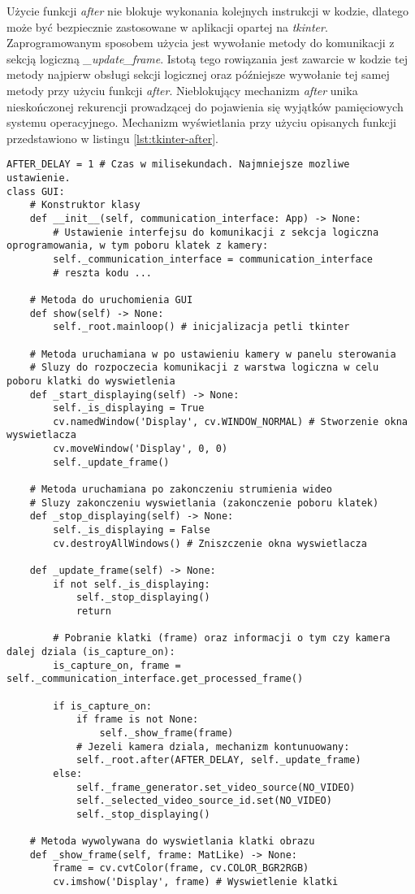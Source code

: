 Użycie funkcji \emph{after} nie blokuje wykonania kolejnych instrukcji w kodzie, dlatego może być bezpiecznie zastosowane w aplikacji opartej na \emph{tkinter}. Zaprogramowanym sposobem użycia jest wywołanie metody do komunikacji z sekcją logiczną \emph{\_update\_frame}. Istotą tego rowiązania jest zawarcie w kodzie tej metody najpierw obsługi sekcji logicznej oraz późniejsze wywołanie tej samej metody przy użyciu funkcji \emph{after}. Nieblokujący mechanizm \emph{after} unika nieskończonej rekurencji prowadzącej do pojawienia się wyjątków pamięciowych systemu operacyjnego. Mechanizm wyświetlania przy użyciu opisanych funkcji przedstawiono w listingu \ref{lst:tkinter-after}.

\begin{lstlisting}[caption={Wyświetlanie klatek obrazu w GUI przy pomocy modułu tkinter.}, label={lst:tkinter-after}]
AFTER_DELAY = 1 # Czas w milisekundach. Najmniejsze mozliwe ustawienie. 
class GUI:
    # Konstruktor klasy
    def __init__(self, communication_interface: App) -> None:
        # Ustawienie interfejsu do komunikacji z sekcja logiczna oprogramowania, w tym poboru klatek z kamery:
        self._communication_interface = communication_interface
        # reszta kodu ...

    # Metoda do uruchomienia GUI
    def show(self) -> None:
        self._root.mainloop() # inicjalizacja petli tkinter

    # Metoda uruchamiana w po ustawieniu kamery w panelu sterowania
    # Sluzy do rozpoczecia komunikacji z warstwa logiczna w celu poboru klatki do wyswietlenia  
    def _start_displaying(self) -> None:
        self._is_displaying = True
        cv.namedWindow('Display', cv.WINDOW_NORMAL) # Stworzenie okna wyswietlacza
        cv.moveWindow('Display', 0, 0)
        self._update_frame()

    # Metoda uruchamiana po zakonczeniu strumienia wideo
    # Sluzy zakonczeniu wyswietlania (zakonczenie poboru klatek)
    def _stop_displaying(self) -> None:
        self._is_displaying = False
        cv.destroyAllWindows() # Zniszczenie okna wyswietlacza

    def _update_frame(self) -> None:
        if not self._is_displaying:
            self._stop_displaying()
            return

        # Pobranie klatki (frame) oraz informacji o tym czy kamera dalej dziala (is_capture_on):
        is_capture_on, frame =  self._communication_interface.get_processed_frame()

        if is_capture_on:
            if frame is not None:
                self._show_frame(frame)
            # Jezeli kamera dziala, mechanizm kontunuowany:
            self._root.after(AFTER_DELAY, self._update_frame)
        else:
            self._frame_generator.set_video_source(NO_VIDEO)
            self._selected_video_source_id.set(NO_VIDEO)
            self._stop_displaying()

    # Metoda wywolywana do wyswietlania klatki obrazu
    def _show_frame(self, frame: MatLike) -> None:
        frame = cv.cvtColor(frame, cv.COLOR_BGR2RGB)
        cv.imshow('Display', frame) # Wyswietlenie klatki
\end{lstlisting}

